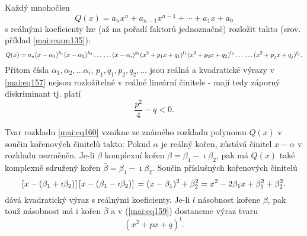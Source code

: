      \begin{mdframed}[style=mdmathlemma] 
        \begin{lemma}\label{mai:lemma010}
          Každý mnohočlen
          \begin{equation*}
            Q(x) = a_nx^n + a_{n-1}x^{n-1} + \cdots + a_1x + a_0
          \end{equation*}
          s reálnými koeficienty lze (až na pořadí faktorů jednoznačně) rozložit takto (srov.
          příklad \ref{mai:exam135}):
          \begin{equation}\label{mai:eq159}
            Q(x) = a_n(x-\alpha_1)^{k_1}(x-\alpha_2)^{k_2}\ldots                   \notag \\
            \ldots(x-\alpha_i)^{k_i}(x^2+p_1x+q_1)^{l_1}(x^2+p_2x+q_2)^{l_2}\ldots \notag \\ 
            \ldots(x^2+p_jx+q_j)^{l_j}.
          \end{equation}
          Přitom čísla \(\alpha_1, \alpha_2, \ldots \alpha_i\), \(p_1, q_1, p_2, q_2, \ldots \) jsou
          reálná a kvadratické výrazy v \ref{mai:eq157} nejsou rozložitelné v reálné lineární
          činitele - mají tedy záporný diskriminant tj. platí
          \begin{equation}\label{mai:eq160}
            \frac{p^2}{4}-q<0.
          \end{equation} 
        \end{lemma}
      \end{mdframed}

      Tvar rozkladu \ref{mai:eq160} vznikne ze známého rozkladu polynomu \(Q(x)\) v součin
      kořenových činitelů takto: Pokud \(\alpha\) je reálný kořen, zůstává činitel \(x-\alpha\) v
      rozkladu nezměněn. Je-li \(\beta\) komplexní kořen \(\beta = \beta_1-\imath\beta_2\), pak má
      \(Q(x)\) také komplexně sdružený kořen \(\bar{\beta} = \beta_1-\imath\beta_2\). Součin
      příslušných kořenových činitelů
      \begin{equation}\label{mai:eq161}
        \left[x-(\beta_1+\imath\beta_2)\right]  
        \left[x-(\beta_1-\imath\beta_2)\right]                                     \notag \\
        = (x-\beta_1)^2+\beta^2_2 = x^2-2\beta_1x + \beta^2_1+\beta^2_2. 
      \end{equation}
      dává kvadratický výraz s reálnými koeficienty. Je-li \(l\) násobnost kořene \(\beta\), pak
      touž násobnost má i kořen \(\bar{\beta}\) a v (\ref{mai:eq159}) dostaneme výraz tvaru
      \begin{equation*}
        (x^2+px+q)^l.
      \end{equation*}

